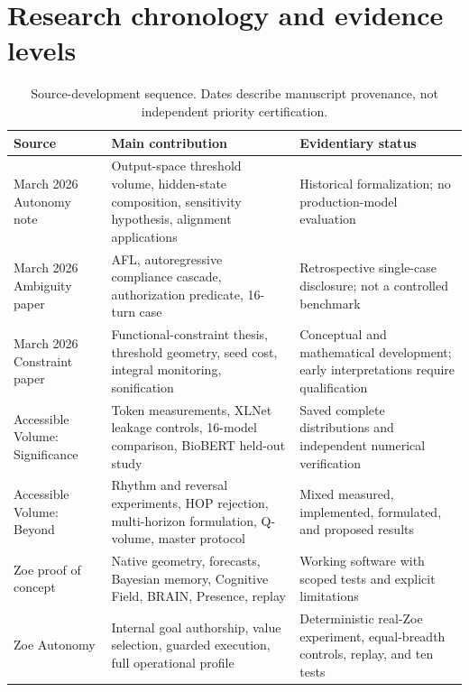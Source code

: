 \section{Research chronology and evidence levels}
\begin{table}[htbp]
\centering
\caption{Source-development sequence. Dates describe manuscript provenance, not independent priority certification.}
\label{tab:chronology}
{\small
\begin{tabularx}{\textwidth}{p{3.0cm}X p{4.0cm}}
\toprule
Source & Main contribution & Evidentiary status \\
\midrule
March 2026 Autonomy note & Output-space threshold volume, hidden-state composition, sensitivity hypothesis, alignment applications & Historical formalization; no production-model evaluation \\
March 2026 Ambiguity paper & AFL, autoregressive compliance cascade, authorization predicate, 16-turn case & Retrospective single-case disclosure; not a controlled benchmark \\
March 2026 Constraint paper & Functional-constraint thesis, threshold geometry, seed cost, integral monitoring, sonification & Conceptual and mathematical development; early interpretations require qualification \\
Accessible Volume: Significance & Token measurements, XLNet leakage controls, 16-model comparison, BioBERT held-out study & Saved complete distributions and independent numerical verification \\
Accessible Volume: Beyond & Rhythm and reversal experiments, HOP rejection, multi-horizon formulation, Q-volume, master protocol & Mixed measured, implemented, formulated, and proposed results \\
Zoe proof of concept & Native geometry, forecasts, Bayesian memory, Cognitive Field, BRAIN, Presence, replay & Working software with scoped tests and explicit limitations \\
Zoe Autonomy & Internal goal authorship, value selection, guarded execution, full operational profile & Deterministic real-Zoe experiment, equal-breadth controls, replay, and ten tests \\
\bottomrule
\end{tabularx}}
\end{table}

